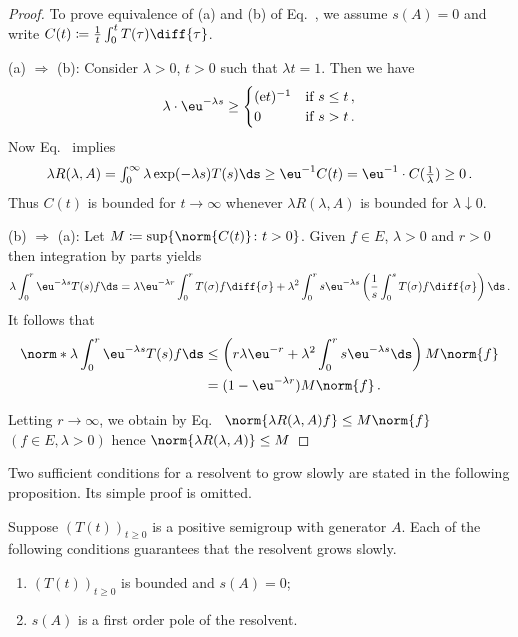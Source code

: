 \begin{proof} 
To prove equivalence of \upshape(a) and \upshape(b) of Eq.~, we assume $s(A) = 0$ and write $C(t) \coloneqq \frac{1}{t} \int_{0}^{t} T(\tau) \diff{\tau}$.

\upshape(a) $\Rightarrow$ \upshape(b): \quad 
Consider $\lambda > 0$, $t > 0$ such that $\lambda t = 1$. 
Then we have
\[
\lambda \cdot \eu^{-\lambda s} \geq 
\begin{cases}
	(\mathrm{e}t)^{-1} & \text{if } s \leq t\,, \\
	0 & \text{if } s > t\,.
\end{cases}
\]
Now Eq.~ implies 
\[\textstyle
\lambda R(\lambda,A) = \int_{0}^{\infty} \lambda \exp(-\lambda s)T(s) \ds \geq \eu^{-1}C(t) = \eu^{-1}\cdot C(\frac{1}{\lambda}) \geq 0\,.
\]
Thus $C(t)$ is bounded for $t \to \infty$ whenever $\lambda R(\lambda,A)$ is bounded for $\lambda \downarrow 0$.

\upshape(b) $\Rightarrow$ \upshape(a):\quad
 Let $M \coloneqq \sup\{\norm{C(t)} \colon t > 0\}$.
Given $f \in E$, $\lambda > 0$ and $r > 0$ then integration by parts yields
\[
	\lambda \int_{0}^{r} \eu^{-\lambda s}T(s)f \ds = \lambda \eu^{-\lambda r} \int_{0}^{r} T(\sigma)f \diff{\sigma} + \lambda^{2}\int_{0}^{r} s\eu^{-\lambda s}\left(\frac{1}{s}\int_{0}^{s} T(\sigma)f \diff{\sigma}\right)\ds\,.
\]
It follows that
\begin{align*}
	\norm*{\lambda \int_{0}^{r} \eu^{-\lambda s}T(s)f \ds} &\leq \left(r\lambda \eu^{-r} + \lambda^{2}\int_{0}^{r} s\eu^{-\lambda s} \ds\right)M\norm{f} \\
	&= (1 - \eu^{-\lambda r})M\norm{f}\,.
\end{align*}

Letting $r \to \infty$, we obtain by Eq.~ $\norm{\lambda R(\lambda,A)f} \leq M\norm{f}$ $(f \in E, \lambda > 0)$ hence $\norm{\lambda R(\lambda,A)} \leq M$
\end{proof}
Two sufficient conditions for a resolvent to grow slowly are stated in the following proposition.
Its simple proof is omitted.
\begin{proposition}\label{prop:c3-2.9}
	Suppose $(T(t))_{t\geq 0}$ is a positive semigroup with generator $A$.
	Each of the following conditions guarantees that the resolvent grows slowly.
	\begin{enumerate}[\upshape (i)]
		\item 
		$(T(t))_{t\geq 0}$ is bounded and $s(A) = 0$;
	
		\item 
		$s(A)$ is a first order pole of the resolvent.
	\end{enumerate}
\end{proposition}
